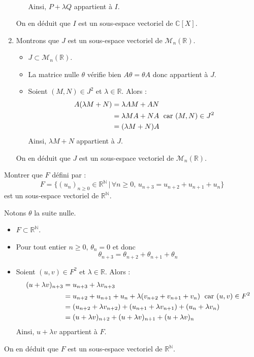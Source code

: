 \documentclass[a4paper,10pt]{report}
\begin{document}
\begin{enumerate}
\begin{itemize}
\begin{align*}
\end{align*}
Ainsi, $P+ \lambda Q$ appartient à $I$.
\end{itemize}
On en déduit que $I$ est un sous-espace vectoriel de $\mathbb{C}[X]$.
\item Montrons que $J$ est un sous-espace vectoriel de $\mathcal{M}_n(\mathbb{R})$.
\begin{itemize}
\item $J \subset \mathcal{M}_n(\mathbb{R})$.
\item La matrice nulle $\theta$ vérifie bien $A \theta = \theta A$ donc appartient à $J$.
\item Soient $(M,N) \in J^2$ et $\lambda \in \mathbb{R}$. Alors :
\begin{align*}
A(\lambda M + N) & = \lambda AM + AN \\
& = \lambda MA + NA \; \hbox{ car } (M,N) \in J^2 \\
& = (\lambda M+N) A 
\end{align*}
Ainsi, $\lambda M +N$ appartient à $J$.
\end{itemize}
On en déduit que $J$ est un sous-espace vectoriel de $\mathcal{M}_n(\mathbb{R})$.
\end{enumerate}


\begin{Exercice}{} Montrer que $F$ défini par :
$$ F = \lbrace (u_n)_{n \geq 0} \in \mathbb{R}^{\mathbb{N}} \, \vert \, \forall n \geq 0, \, u_{n+3}=u_{n+2}+u_{n+1}+u_n \rbrace$$
est un sous-espace vectoriel de $\mathbb{R}^{\mathbb{N}}$.
\end{Exercice}

\corr Notons $\theta$ la suite nulle.

\begin{itemize}
\item $F \subset \mathbb{R}^{\mathbb{N}}$.
\item Pour tout entier $n \geq 0$, $\theta_n = 0$ et donc
$$ \theta_{n+3} = \theta_{n+2} + \theta_{n+1} + \theta_n$$
\item Soient $(u,v) \in F^2$ et $\lambda \in \mathbb{R}$. Alors :
\begin{align*}
(u+\lambda v)_{n+3} & = u_{n+3} + \lambda v_{n+3} \\
& = u_{n+2}+u_{n+1}+u_n + \lambda (v_{n+2}+v_{n+1}+v_n) \; \hbox{ car } (u,v) \in F^2 \\
& = (u_{n+2} + \lambda v_{n+2}) + (u_{n+1} + \lambda v_{n+1}) + (u_n + \lambda v_n) \\
& = (u+\lambda v)_{n+2} + (u+\lambda v)_{n+1} + (u+\lambda v)_{n}
\end{align*}
Ainsi, $u+ \lambda v$ appartient à $F$.
\end{itemize}
On en déduit que $F$ est un sous-espace vectoriel de $\mathbb{R}^{\mathbb{N}}$.
\end{document}
